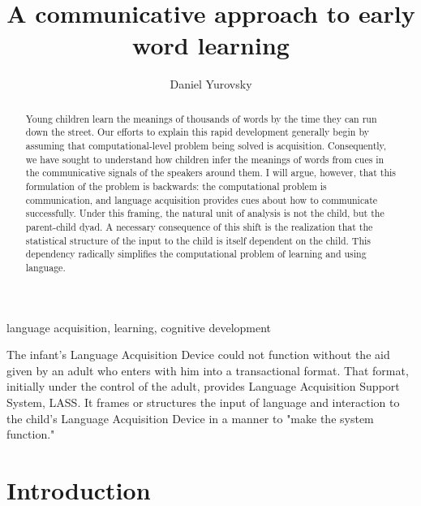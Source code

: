 \documentclass[review]{elsarticle}
\begin{document}
\begin{frontmatter}

\title{A communicative approach to early word learning}

\author{Daniel Yurovsky}
\address{Department of Psychology, University of Chicago, \\5848 S University Ave., Chicago, IL 60637, USA}

\begin{abstract}
Young children learn the meanings of thousands of words by the time they can run down the street. Our efforts to explain this rapid development generally begin by assuming that computational-level problem being solved is acquisition. Consequently, we have sought to understand how children infer the meanings of words from cues in the communicative signals of the speakers around them. I will argue, however, that this formulation of the problem is backwards: the computational problem is communication, and language acquisition provides cues about how to communicate successfully. Under this framing, the natural unit of analysis is not the child, but the parent-child dyad. A necessary consequence of this shift is the realization that the statistical structure of the input to the child is itself dependent on the child. This dependency radically simplifies the computational problem of learning and using language.
\end{abstract}

\begin{keyword}
language acquisition, learning, cognitive development
\end{keyword}

\end{frontmatter}

\linenumbers
\renewcommand{\epigraphwidth}{\textwidth}

\epigraph{The infant's Language Acquisition Device could not function without the aid given by an adult who enters with him into a transactional format. That format, initially under the control of the adult, provides  Language Acquisition Support System, LASS. It frames or structures the input of language and interaction to the child's Language Acquisition Device in a manner to "make the system function."}{\cite{bruner1983}}


\section{Introduction}
\end{document}
